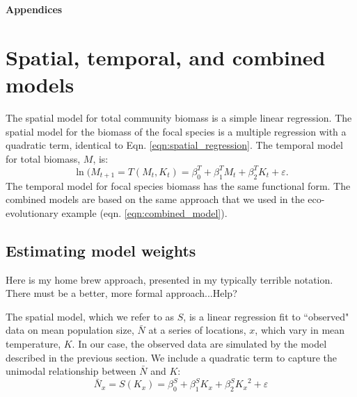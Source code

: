 \documentclass[11pt]{article}
\begin{document}
\newpage
\renewcommand{\refname}{Literature cited}





\clearpage 
\newpage 

\setcounter{page}{1}
\setcounter{equation}{0}
\setcounter{figure}{0}
\setcounter{section}{0}
\setcounter{table}{0}

\centerline{\Large \textbf{Appendices}}

\vspace{0.4in} 

\renewcommand{\theequation}{A-\arabic{equation}}
\renewcommand{\thetable}{A-\arabic{table}}
\renewcommand{\thefigure}{A-\arabic{figure}}
\renewcommand{\thesection}{\Alph{section}}

\section{Spatial, temporal, and combined models}\label{metacomm}

The spatial model for total community biomass is a simple linear regression. The spatial model for the biomass of the focal species is a multiple regression with a quadratic term, identical to Eqn. \ref{eqn:spatial_regression}. The temporal model for total biomass, $M$, is:
 \begin{equation}
 \ln(M_{t+1} = T(M_{t},K_t) = \beta^T_0 +  \beta^T_1 M_t +\beta^T_2 K_t  +  \varepsilon .
 \label{eqn:community_temporal_regression}
 \end{equation}
The temporal model for focal species biomass has the same functional form. The combined models are based on the same approach that we used in the eco-evolutionary example (eqn. \ref{eqn:combined_model}).

\subsection{Estimating model weights}\label{weights}

Here is my home brew approach, presented in my typically terrible notation. There must be a better, more formal approach...Help?

The spatial model, which we refer to as $S$, is a linear regression fit to ``observed" data on mean population size, $\bar{N}$ at a series of locations, $x$, which vary in mean temperature, $K$. In our case, the observed data are simulated by the model described in the previous section. We include a quadratic term to capture the unimodal relationship between  $\bar{N}$ and $K$:
 \begin{equation}
 \bar{N}_x = S(K_x) = \beta^S_0 +  \beta^S_1 K_x +\beta^S_2 {K_x}^2 + \varepsilon
 \label{eqn:spatial_regression}
 \end{equation}
\end{document}
